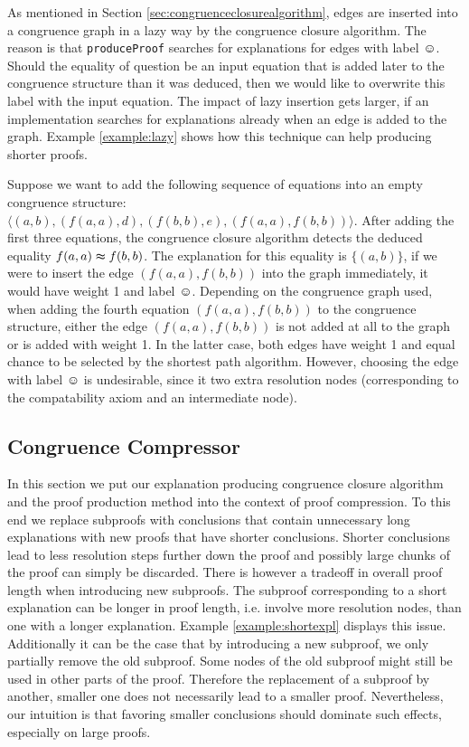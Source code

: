As mentioned in Section \ref{sec:congruenceclosurealgorithm}, edges are inserted into a congruence graph in a lazy way by the congruence closure algorithm.
The reason is that \texttt{produceProof} searches for explanations for edges with label $\smiley$.
Should the equality of question be an input equation that is added later to the congruence structure than it was deduced, then we would like to overwrite this label with the input equation.
The impact of lazy insertion gets larger, if an implementation searches for explanations already when an edge is added to the graph.
Example \ref{example:lazy} shows how this technique can help producing shorter proofs.

\begin{example}
\label{example:lazy}
Suppose we want to add the following sequence of equations into an empty congruence structure: $\langle (a,b),(f(a,a),d),(f(b,b),e),(f(a,a),f(b,b)) \rangle$.
After adding the first three equations, the congruence closure algorithm detects the deduced equality $f(a,a) \thickapprox f(b,b)$.
The explanation for this equality is $\{(a,b)\}$, if we were to insert the edge $(f(a,a),f(b,b))$ into the graph immediately, it would have weight 1 and label $\smiley$.
Depending on the congruence graph used, when adding the fourth equation $(f(a,a),f(b,b))$ to the congruence structure, either the edge $(f(a,a),f(b,b))$ is not added at all to the graph or is added with weight 1.
In the latter case, both edges have weight 1 and equal chance to be selected by the shortest path algorithm.
However, choosing the edge with label $\smiley$ is undesirable, since it two extra resolution nodes (corresponding to the compatability axiom and an intermediate node).

\end{example}

\FloatBarrier

\subsection*{Congruence Compressor}

In this section we put our explanation producing congruence closure algorithm and the proof production method into the context of proof compression.
To this end we replace subproofs with conclusions that contain unnecessary long explanations with new proofs that have shorter conclusions.
Shorter conclusions lead to less resolution steps further down the proof and possibly large chunks of the proof can simply be discarded.
There is however a tradeoff in overall proof length when introducing new subproofs.
The subproof corresponding to a short explanation can be longer in proof length, i.e. involve more resolution nodes, than one with a longer explanation.
Example \ref{example:shortexpl} displays this issue.
Additionally it can be the case that by introducing a new subproof, we only partially remove the old subproof.
Some nodes of the old subproof might still be used in other parts of the proof.
Therefore the replacement of a subproof by another, smaller one does not necessarily lead to a smaller proof.
Nevertheless, our intuition is that favoring smaller conclusions should dominate such effects, especially on large proofs.

